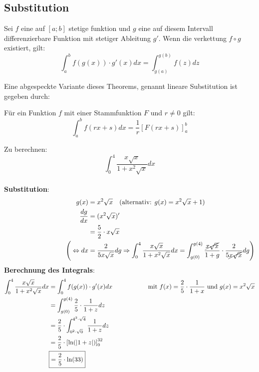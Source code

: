 \subsection{Substitution}
\begin{Theorem}
  Sei $f$ eine auf $[a;b]$ stetige funktion und $g$ eine auf diesem Intervall differenzierbare Funktion mit stetiger Ableitung
  $g'$. Wenn die verkettung $f \circ g$ existiert, gilt:
  $$\int_a^b f(g(x))\cdot g'(x)dx=\int_{g(a)}^{g(b)}f(z)dz$$
\end{Theorem}
Eine abgespeckte Variante dieses Theorems, genannt lineare Substitution ist gegeben durch:
\begin{Theorem}
  Für ein Funktion $f$ mit einer Stammfunktion $F$ und $r\neq 0$ gilt:
  $$\int_a^b f(rx+s)dx=\dfrac{1}{r}[F(rx+s)]_a^b$$
\end{Theorem}
\begin{Beispiel}
    Zu berechnen: $$\int_0^4 \dfrac{x\sqrt{x}}{1 + x^2\sqrt{x}} dx$$ \\
    \textbf{Substitution}:
    \begin{align*}
        \quad \qquad \qquad \qquad \qquad \qquad
        g(x) &= x^2\sqrt{x} \quad (\text{alternativ: } g(x) = x^2\sqrt{x} + 1) \\
        \dfrac{dg}{dx} &= (x^2\sqrt{x})' \\
                          &= \dfrac{5}{2} \cdot x\sqrt{x} \\
        \Bigg(\Leftrightarrow dx &= \dfrac{2}{5x\sqrt{x}}dg \Rightarrow \int_0^4 \dfrac{x\sqrt{x}}{1 + x^2\sqrt{x}} dx = \int_{g(0)}^{g(4)} \dfrac{\cancel{x\sqrt{x}}}{1 + g} \cdot \dfrac{2}{5\cancel{x\sqrt{x}}}dg\Bigg)
    \end{align*}
    \textbf{Berechnung des Integrals}:
    \begin{align*}
        \int_0^4 \dfrac{x\sqrt{x}}{1 + x^2\sqrt{x}} dx &= \int_0^4 f(g(x))\cdot g'(x)dx \text{\hspace{2cm}mit $f(x)=\dfrac{2}{5} \cdot \dfrac{1}{1+x}$ und $g(x) = x^2\sqrt{x}$}\\
        &= \int_{g(0)}^{g(4)} \dfrac{2}{5} \cdot\dfrac{1}{1 + z}dz \\
        &= \dfrac{2}{5} \cdot \int_{0^2\cdot\sqrt{0}}^{4^2\cdot\sqrt{4}} \dfrac{1}{1 + z}dz \\
        &= \dfrac{2}{5} \cdot \left[\ln(|1 + z|)\right]_0^{32} \\
        &\boxed{= \dfrac{2}{5} \cdot \ln(33)}
    \end{align*}
\end{Beispiel}

